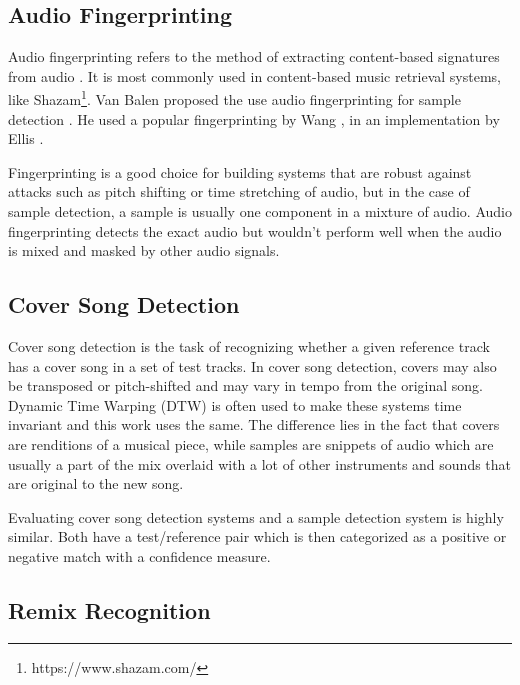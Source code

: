 \documentclass{article}
\begin{document}
\subsection{Audio Fingerprinting}

Audio fingerprinting refers to the method of extracting content-based signatures from audio \cite{cano2005review}. It is most commonly used in content-based music retrieval systems, like Shazam\footnote{https://www.shazam.com/}.
Van Balen proposed the use audio fingerprinting for sample detection \cite{van2011automatic}. He used a popular fingerprinting by Wang \cite{wang2003industrial}, in an implementation by Ellis \cite{ellisfinger}. 

Fingerprinting is a good choice for building systems that are robust against attacks such as pitch shifting or time stretching of audio, but in the case of sample detection, a sample is usually one component in a mixture of audio. Audio fingerprinting detects the exact audio but wouldn't perform well when the audio is mixed and masked by other audio signals.

\subsection{Cover Song Detection}
Cover song detection is the task of recognizing whether a given reference track has a cover song in a set of test tracks\cite{Ellis2007Cover,serracover,bertin2011large}.
In cover song detection, covers may also be transposed or pitch-shifted and may vary in tempo from the original song. Dynamic Time Warping (DTW) \cite{berndt1994using} is often used to make these systems time invariant and this work uses the same. The difference lies in the fact that covers are renditions of a musical piece, while samples are snippets of audio which are usually a part of the mix overlaid with a lot of other instruments and sounds that are original to the new song.

Evaluating cover song detection systems and a sample detection system is highly similar. Both have a test/reference pair which is then categorized as a positive or negative match with a confidence measure. 
\subsection{Remix Recognition}
\end{document}
